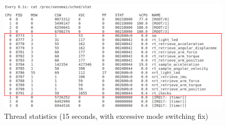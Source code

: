 \documentclass[12pt]{scrreprt}
\begin{document}
\begin{figure}[H]
    \centering
    \includegraphics[width=\textwidth]{Figures/results/stat/15sec_good_with_frames.png}
    \caption{Thread statistics (15 seconds, with excessive mode switching fix)}
    \label{fig:15sec_good}
\end{figure}
\end{document}
